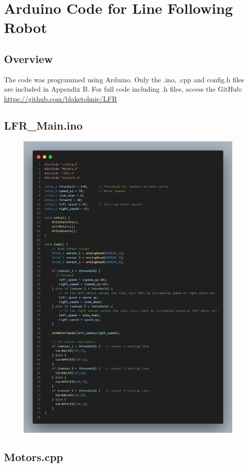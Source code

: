 \appendix
\section{Arduino Code for Line Following Robot}
\subsection{Overview}
The code was programmed using Arduino. Only the .ino, .cpp and config.h files are included in Appendix B. For full code including .h files, access the GitHub: \href{https://github.com/blaketolmie/LFR}{https://github.com/blaketolmie/LFR}
\subsection{LFR\_Main.ino}

\begin{figure}[H]
    \centering
    \includegraphics[width=0.8\linewidth]{REPORT/LFR_main.png}
\end{figure}

\subsection{Motors.cpp}

